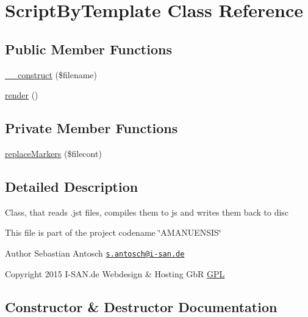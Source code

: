 \hypertarget{a00041}{}\section{Script\+By\+Template Class Reference}
\label{a00041}
\subsection*{Public Member Functions}
\begin{DoxyCompactItemize}
\item 
\hyperlink{a00041_a3387125924c13e72878c47ecad75faca}{\+\_\+\+\_\+construct} (\$filename)
\item 
\hyperlink{a00041_afde88292c44dc59faf017738dae6dffb}{render} ()
\end{DoxyCompactItemize}
\subsection*{Private Member Functions}
\begin{DoxyCompactItemize}
\item 
\hyperlink{a00041_ab5fc580656acd4c894f79ae7f25b3ab3}{replace\+Markers} (\$filecont)
\end{DoxyCompactItemize}


\subsection{Detailed Description}
Class, that reads .jst files, compiles them to js and writes them back to disc

This file is part of the project codename \char`\"{}\+A\+M\+A\+N\+U\+E\+N\+S\+I\+S\char`\"{}

\begin{DoxyAuthor}{Author}
Sebastian Antosch \href{mailto:s.antosch@i-san.de}{\tt s.\+antosch@i-\/san.\+de} 
\end{DoxyAuthor}
\begin{DoxyCopyright}{Copyright}
2015 I-\/\+S\+A\+N.\+de Webdesign \& Hosting Gb\+R \hyperlink{}{G\+P\+L }
\end{DoxyCopyright}


\subsection{Constructor \& Destructor Documentation}
\hypertarget{a00041_a3387125924c13e72878c47ecad75faca}{}
